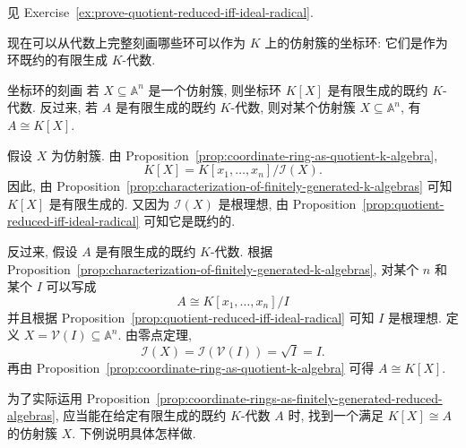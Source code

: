 \begin{Proof}
  见 Exercise~\ref{ex:prove-quotient-reduced-iff-ideal-radical}.
\end{Proof}

现在可以从代数上完整刻画哪些环可以作为 $K$ 上的仿射簇的坐标环: 它们是作为环既约的有限生成 $K$-代数.

\begin{Proposition}{坐标环的刻画}\leavevmode\label{prop:coordinate-rings-as-finitely-generated-reduced-algebras}
  若 $X\subseteq\mathbb{A}^{n}$ 是一个仿射簇, 则坐标环 $K[X]$ 是有限生成的既约 $K$-代数. 反过来, 若 $A$ 是有限生成的既约 $K$-代数, 则对某个仿射簇 $X\subseteq\mathbb{A}^{n}$, 有 $A\cong K[X]$.
\end{Proposition}

\begin{Proof}
  假设 $X$ 为仿射簇. 由 Proposition~\ref{prop:coordinate-ring-as-quotient-k-algebra},
  \[
    K[X]=K[x_{1},\ldots,x_{n}]/\mathcal{I}(X).
  \]
  因此, 由 Proposition~\ref{prop:characterization-of-finitely-generated-k-algebras} 可知 $K[X]$ 是有限生成的. 又因为 $\mathcal{I}(X)$ 是根理想, 由 Proposition~\ref{prop:quotient-reduced-iff-ideal-radical} 可知它是既约的.

  反过来, 假设 $A$ 是有限生成的既约 $K$-代数. 根据 Proposition~\ref{prop:characterization-of-finitely-generated-k-algebras}, 对某个 $n$ 和某个 $I$ 可以写成
  \[
    A\cong K[x_{1},\ldots,x_{n}]/I
  \]
  并且根据 Proposition~\ref{prop:quotient-reduced-iff-ideal-radical} 可知 $I$ 是根理想. 定义 $X=\mathcal{V}(I)\subseteq\mathbb{A}^{n}$. 由零点定理,
  \[
    \mathcal{I}(X)=\mathcal{I}(\mathcal{V}(I))=\sqrt{I}=I.
  \]
  再由 Proposition~\ref{prop:coordinate-ring-as-quotient-k-algebra} 可得 $A\cong K[X]$.
\end{Proof}

为了实际运用 Proposition~\ref{prop:coordinate-rings-as-finitely-generated-reduced-algebras}, 应当能在给定有限生成的既约 $K$-代数 $A$ 时, 找到一个满足 $K[X]\cong A$ 的仿射簇 $X$. 下例说明具体怎样做.

